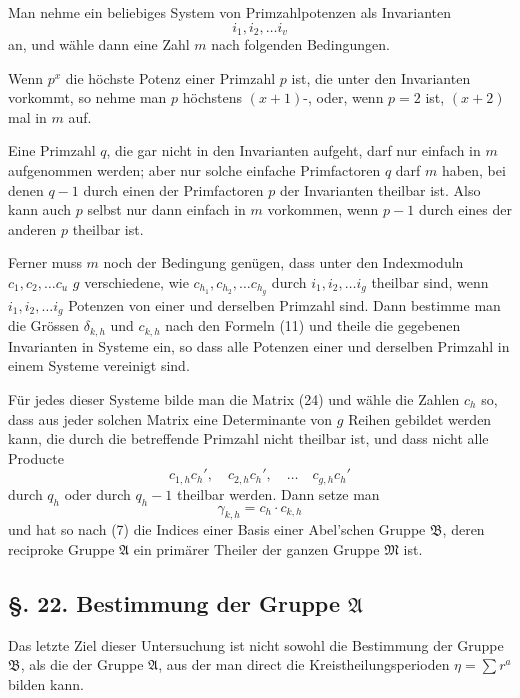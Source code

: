 \documentclass[12pt,a4paper]{article}
\theoremstyle{plain}
\theoremstyle{definition}
\theoremstyle{remark}
\begin{document}
Man nehme ein beliebiges System von Primzahlpotenzen als Invarianten
\[
i_1, i_2, \ldots i_v
\]
an, und wähle dann eine Zahl $m$ nach folgenden Bedingungen.

Wenn $p^x$ die höchste Potenz einer Primzahl $p$ ist, die unter den Invarianten vorkommt, so nehme man $p$ höchstens $(x+1)$-, oder, wenn $p = 2$ ist, $(x+2)$ mal in $m$ auf.

Eine Primzahl $q$, die gar nicht in den Invarianten aufgeht, darf nur einfach in $m$ aufgenommen werden; aber nur solche einfache Primfactoren $q$ darf $m$ haben, bei denen $q-1$ durch einen der Primfactoren $p$ der Invarianten theilbar ist. Also kann auch $p$ selbst nur dann einfach in $m$ vorkommen, wenn $p-1$ durch eines der anderen $p$ theilbar ist.

Ferner muss $m$ noch der Bedingung genügen, dass unter den Indexmoduln $c_1, c_2, \ldots c_u$ $g$ verschiedene, wie $c_{h_1}, c_{h_2}, \ldots c_{h_g}$ durch $i_1, i_2, \ldots i_g$ theilbar sind, wenn $i_1, i_2, \ldots i_g$ Potenzen von einer und derselben Primzahl sind. Dann bestimme man die Grössen $\delta_{k,h}$ und $c_{k,h}$ nach den Formeln (11) und theile die gegebenen Invarianten in Systeme ein, so dass alle Potenzen einer und derselben Primzahl in einem Systeme vereinigt sind.

Für jedes dieser Systeme bilde man die Matrix (24) und wähle die Zahlen $c_h$ so, dass aus jeder solchen Matrix eine Determinante von $g$ Reihen gebildet werden kann, die durch die betreffende Primzahl nicht theilbar ist, und dass nicht alle Producte
\[
c_{1,h} c_{h}', \quad c_{2,h} c_{h}', \quad \ldots \quad c_{g,h} c_{h}'
\]
durch $q_h$ oder durch $q_h-1$ theilbar werden. Dann setze man
\[
\gamma_{k,h} = c_h \cdot c_{k,h}
\]
und hat so nach (7) die Indices einer Basis einer Abel'schen Gruppe $\mathfrak{B}$, deren reciproke Gruppe $\mathfrak{A}$ ein primärer Theiler der ganzen Gruppe $\mathfrak{M}$ ist.



\subsection*{\S. 22. Bestimmung der Gruppe $\mathfrak{A}$}

Das letzte Ziel dieser Untersuchung ist nicht sowohl die Bestimmung der Gruppe $\mathfrak{B}$, als die der Gruppe $\mathfrak{A}$, aus der man direct die Kreistheilungsperioden $\eta = \sum r^a$ bilden kann.
\end{document}
